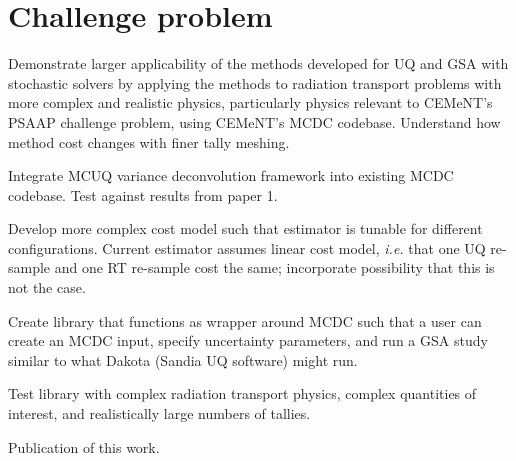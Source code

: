 \section{Challenge problem}
Demonstrate larger applicability of the methods developed for UQ and GSA with stochastic solvers by applying the methods to radiation transport problems with more complex and realistic physics, particularly physics relevant to CEMeNT's PSAAP challenge problem, using CEMeNT's MCDC codebase. Understand how method cost changes with finer tally meshing.
\begin{todolist}
    \item Integrate MCUQ variance deconvolution framework into existing MCDC codebase. Test against results from paper 1. 
    \item Develop more complex cost model such that estimator is tunable for different configurations. Current estimator assumes linear cost model, \textit{i.e.} that one UQ re-sample and one RT re-sample cost the same; incorporate possibility that this is not the case.
    \item Create library that functions as wrapper around MCDC such that a user can create an MCDC input, specify uncertainty parameters, and run a GSA study similar to what Dakota (Sandia UQ software) might run.
    \item Test library with complex radiation transport physics, complex quantities of interest, and realistically large numbers of tallies.
    \item Publication of this work.
\end{todolist}


